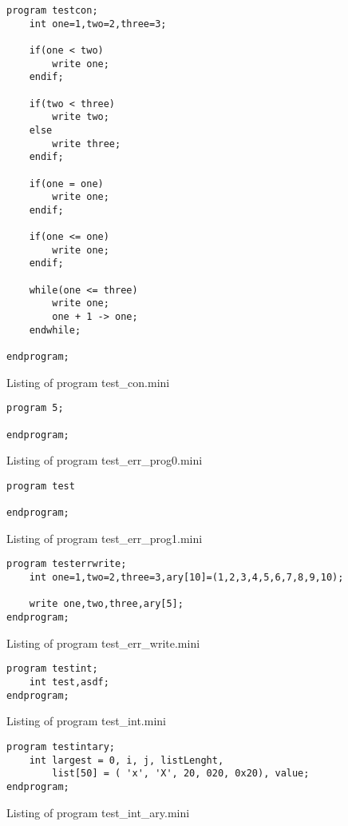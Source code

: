 \documentclass[english]{article}
\begin{document}
\begin{program}
\begin{verbatim}
program testcon;
	int one=1,two=2,three=3;

	if(one < two)
		write one;
	endif;

	if(two < three)
		write two;
	else
		write three;
	endif;

	if(one = one)
		write one;
	endif;

	if(one <= one)
		write one;
	endif;

	while(one <= three)
		write one;
		one + 1 -> one;
	endwhile;

endprogram;\end{verbatim}
\caption{Listing of program test\_con.mini}
\end{program}

\begin{program}
\begin{verbatim}
program 5;

endprogram;
\end{verbatim}
\caption{Listing of program test\_err\_prog0.mini}
\end{program}

\begin{program}
\begin{verbatim}
program test

endprogram;
\end{verbatim}
\caption{Listing of program test\_err\_prog1.mini}
\end{program}

\begin{program}
\begin{verbatim}
program testerrwrite;
	int one=1,two=2,three=3,ary[10]=(1,2,3,4,5,6,7,8,9,10);

	write one,two,three,ary[5];
endprogram;\end{verbatim}
\caption{Listing of program test\_err\_write.mini}
\end{program}

\begin{program}
\begin{verbatim}
program testint;
	int test,asdf;
endprogram;
\end{verbatim}
\caption{Listing of program test\_int.mini}
\end{program}

\begin{program}
\begin{verbatim}
program testintary;
	int largest = 0, i, j, listLenght,
		list[50] = ( 'x', 'X', 20, 020, 0x20), value;
endprogram;
\end{verbatim}
\caption{Listing of program test\_int\_ary.mini}
\end{program}
\end{document}
